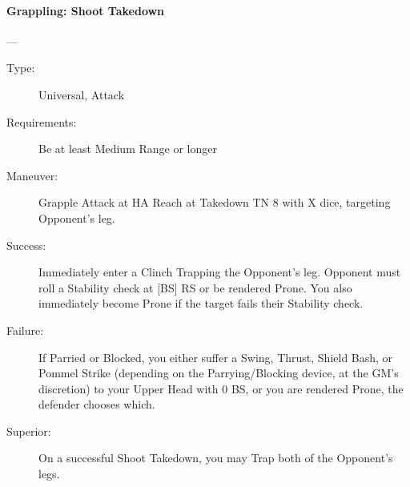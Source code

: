 \paragraph{Grappling: Shoot Takedown \large} \label{man:grappling-takedown}
---\quad {\large [X]}

\vspace{-10pt} \begin{description}
\item [Type:] Universal, Attack
\item [Requirements:] Be at least Medium Range or longer
\item [Maneuver:] Grapple Attack at HA Reach at Takedown TN 8 with X dice,
  targeting Opponent’s leg.

\item [Success:] Immediately enter a Clinch Trapping the Opponent’s leg.
  Opponent must roll a Stability check at [BS] RS or be rendered Prone. You also
  immediately become Prone if the target fails their Stability check.

\item [Failure:] If Parried or Blocked, you either suffer a Swing, Thrust,
  Shield Bash, or Pommel Strike (depending on the Parrying/Blocking device, at
  the GM's discretion) to your Upper Head with 0 BS, or you are rendered Prone,
  the defender chooses which.

\item [Superior:] On a successful Shoot Takedown, you may Trap both of the
  Opponent’s legs. 
\end{description}

